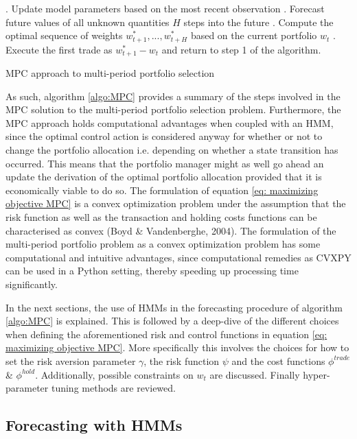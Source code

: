 \begin{algorithm}[H]
. Update model parameters based on the most recent observation
\Indm
{}. Forecast future values of all unknown quantities $H$ steps into the future
. Compute the optimal sequence of weights $w_{t+1}^*,...,w_{t+H}^*$ based on the current portfolio $w_t$
. Execute the first trade as $w_{t+1}^* - w_t$ and return to step 1 of the algorithm.\;
\BlankLine
\caption{MPC approach to multi-period portfolio selection}
\label{algo:MPC}
\end{algorithm}

As such, algorithm \ref{algo:MPC} provides a summary of the steps involved in the MPC solution to the multi-period portfolio selection problem. Furthermore, the MPC approach holds computational advantages when coupled with an HMM, since the optimal control action is considered anyway for whether or not to change the portfolio allocation i.e. depending on whether a state transition has occurred. This means that the portfolio manager might as well go ahead an update the derivation of the optimal portfolio allocation provided that it is economically viable to do so. The formulation of equation \ref{eq: maximizing objective MPC} is a convex optimization problem under the assumption that the risk function as well as the transaction and holding costs functions can be characterised as convex (Boyd \& Vandenberghe, 2004). The formulation of the multi-period portfolio problem as a convex optimization problem has some computational and intuitive advantages, since computational remedies as CVXPY can be used in a Python setting, thereby speeding up processing time significantly.

In the next sections, the use of HMMs in the forecasting procedure of algorithm \ref{algo:MPC} is explained. This is followed by a deep-dive of the different choices when defining the aforementioned risk and control functions in equation \ref{eq: maximizing objective MPC}. More specifically this involves the choices for how to set the risk aversion parameter $\gamma$, the risk function $\psi$ and the cost functions $\phi^{trade}$ \& $\phi^{hold}$. Additionally, possible constraints on $w_t$ are discussed. Finally hyper-parameter tuning methods are reviewed.

\subsection{Forecasting with HMMs}
\label{section: forecasting MPC HMM}

